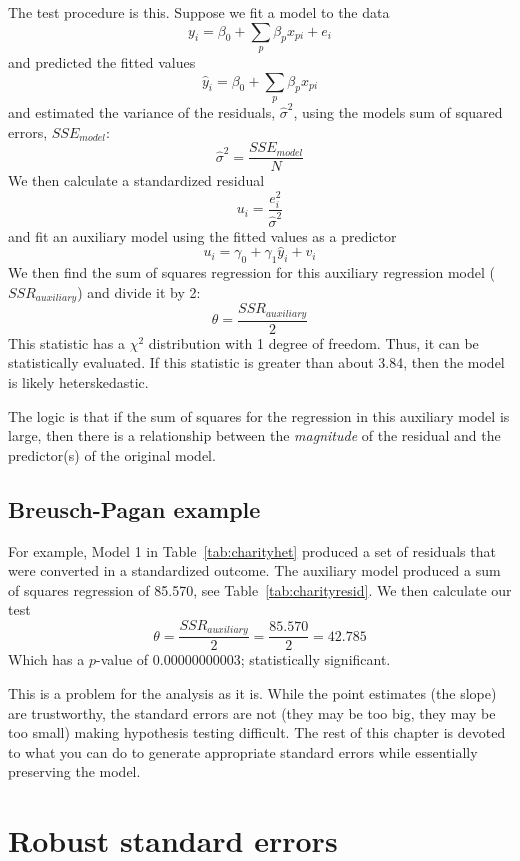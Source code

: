 The test procedure is this. Suppose we fit a model to the data
\[
y_i = \beta_0+\sum_p\beta_px_{pi}+e_i
\]
and predicted the fitted values
\[
\hat{y}_i = \beta_0+\sum_p\beta_px_{pi}
\]
and estimated the variance of the residuals, $\hat{\sigma}^2$, using the models sum of squared errors, $SSE_{model}$:
\begin{equation}
\hat{\sigma}^2=\frac{SSE_{model}}{N}
\end{equation}
We then calculate a standardized residual
\begin{equation}
u_i=\frac{e_i^2}{\hat{\sigma}^2}
\end{equation}
and fit an auxiliary model using the fitted values as a predictor
\[
u_i=\gamma_0+\gamma_1\hat{y}_i+v_i
\]
We then find the sum of squares regression for this auxiliary regression model ($SSR_{auxiliary}$) and divide it by 2:
\begin{equation}
\theta=\frac{SSR_{auxiliary}}{2}
\end{equation}
This statistic has a $\chi^2$ distribution with 1 degree of freedom. Thus, it can be statistically evaluated. If this statistic is greater than about 3.84, then the model is likely heterskedastic.

The logic is that if the sum of squares for the regression in this auxiliary model is large, then there is a relationship between the {\it magnitude} of the residual and the predictor(s) of the original model.

\subsection{Breusch-Pagan example}

For example, Model 1 in Table~\ref{tab:charityhet} produced a set of residuals that were converted in a standardized outcome. The auxiliary model produced a sum of squares regression of 85.570, see Table~\ref{tab:charityresid}. We then calculate our test
\[
\theta=\frac{SSR_{auxiliary}}{2}=\frac{85.570}{2}=42.785
\]
Which has a $p$-value of 0.00000000003; statistically significant.

This is a problem for the analysis as it is. While the point estimates (the slope) are trustworthy, the standard errors are not (they may be too big, they may be too small) making hypothesis testing difficult. The rest of this chapter is devoted to what you can do to generate appropriate standard errors while essentially preserving the model.

\section{Robust standard errors}

